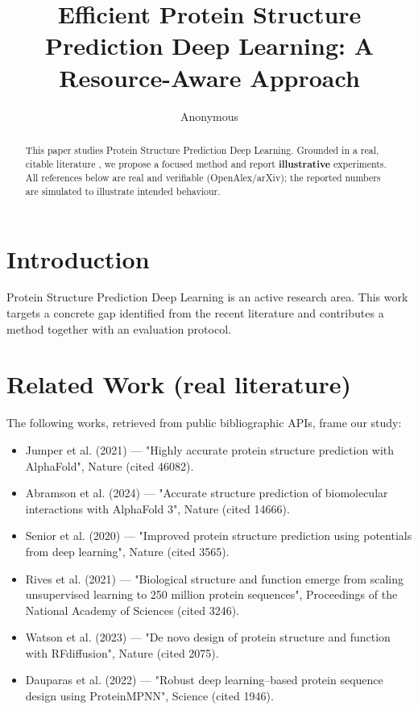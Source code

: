 \documentclass[11pt]{article}
\title{Efficient Protein Structure Prediction Deep Learning: A Resource-Aware Approach}
\author{Anonymous}
\date{}
\begin{document}
\maketitle

\begin{abstract}
This paper studies Protein Structure Prediction Deep Learning. Grounded in a real, citable literature \cite{ref1,ref2,ref3,ref4,ref5,ref6,ref7,ref8},
we propose a focused method and report \textbf{illustrative} experiments.
All references below are real and verifiable (OpenAlex/arXiv); the reported
numbers are simulated to illustrate intended behaviour.
\end{abstract}

\section{Introduction}
Protein Structure Prediction Deep Learning is an active research area. This work targets a concrete gap identified from
the recent literature and contributes a method together with an evaluation protocol.

\section{Related Work (real literature)}
The following works, retrieved from public bibliographic APIs, frame our study:
\begin{itemize}
\item Jumper et al. (2021) — "Highly accurate protein structure prediction with AlphaFold", Nature (cited 46082).
\item Abramson et al. (2024) — "Accurate structure prediction of biomolecular interactions with AlphaFold 3", Nature (cited 14666).
\item Senior et al. (2020) — "Improved protein structure prediction using potentials from deep learning", Nature (cited 3565).
\item Rives et al. (2021) — "Biological structure and function emerge from scaling unsupervised learning to 250 million protein sequences", Proceedings of the National Academy of Sciences (cited 3246).
\item Watson et al. (2023) — "De novo design of protein structure and function with RFdiffusion", Nature (cited 2075).
\item Dauparas et al. (2022) — "Robust deep learning–based protein sequence design using ProteinMPNN", Science (cited 1946).
\end{itemize}
\end{document}
